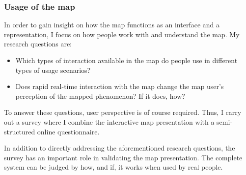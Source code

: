 

\subsubsection{Usage of the map}  %

In order to gain insight on how the map functions as an interface and a representation,
I focus on how people work with and understand the map.
My research questions are:  %

\begin{itemize}
	\item Which types of interaction available in the map do people use
	in different types of usage scenarios?
	\item Does rapid real-time interaction with the map change
	the map user's perception of the mapped phenomenon? If it does, how?
\end{itemize}

To answer these questions, user perspective is of course required.
Thus, I carry out a survey
where I combine the interactive map presentation with
a semi-structured online questionnaire.

In addition to directly addressing the aforementioned research questions,
the survey has an important role in validating the map presentation.
The complete system can be judged by
how, and if, it works when used by real people.




